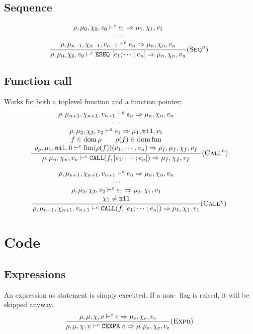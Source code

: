 \subsection{Sequence}
\[\dfrac{\begin{array}{c}
    \rho,\mu_0,\chi_0,v_0 \vdash^e e_1 \Rightarrow \mu_1,\chi_1,v_1 \\
    \cdots \\
    \rho,\mu_{n-1},\chi_{n-1},v_{n-1} \vdash^e e_n \Rightarrow \mu_n,\chi_n,v_n \\
\end{array}}{\rho,\mu_0,\chi_0,v_0 \vdash^e \texttt{ESEQ}\ [e_1;\cdots;e_n] \Rightarrow \mu_n,\chi_n,v_n} (\textsc{Seq}^n)\]

\subsection{Function call}
Works for both a toplevel function and a function pointer:
\[\dfrac{\begin{array}{c}
    \rho,\mu_{n+1},\chi_{n+1},v_{n+1} \vdash^e e_n \Rightarrow \mu_n,\chi_n,v_n \\
    \cdots \\
    \rho,\mu_2,\chi_2,v_2 \vdash^e e_1 \Rightarrow \mu_1,\texttt{nil},v_1 \\
    f\in\operatorname{dom}\rho \qquad \rho(f)\in\operatorname{dom}\text{fun} \\
    \rho_g,\mu_1,\texttt{nil},0 \vdash^e \text{fun}(\rho(f))(v_1, \cdots, v_n) \Rightarrow \rho_f,\mu_f,\chi_f,v_f
\end{array}}{\rho,\mu_n,\chi_n,v_n \vdash^e \texttt{CALL}(f, [e_1; \cdots; e_n]) \Rightarrow \mu_f,\chi_f,v_f} (\textsc{Call}^n)\]

\[\dfrac{\begin{array}{c}
    \rho,\mu_{n+1},\chi_{n+1},v_{n+1} \vdash^e e_n \Rightarrow \mu_n,\chi_n,v_n \\
    \cdots \\
    \rho,\mu_2,\chi_2,v_2 \vdash^e e_1 \Rightarrow \mu_1,\chi_1,v_1 \\
    \chi_1\ne\texttt{nil} \\
\end{array}}{\rho,\mu_{n+1},\chi_{n+1},v_{n+1} \vdash^e \texttt{CALL}(f, [e_1; \cdots; e_n]) \Rightarrow \mu_1,\chi_1,v_1} (\textsc{Call}^\chi)\]


\section{Code}
\subsection{Expressions}
An expression as statement is simply executed. If a non-\nil\ flag is raised, it will be skipped anyway.\\
\[\dfrac{
    \rho,\mu,\chi,v \vdash^e e \Rightarrow \mu_e,\chi_e,v_e
}{\rho,\mu,\chi,v \vdash^c \texttt{CEXPR}\ e \Rightarrow \rho,\mu_e,\chi_e,v_e}(\textsc{Expr})\]

